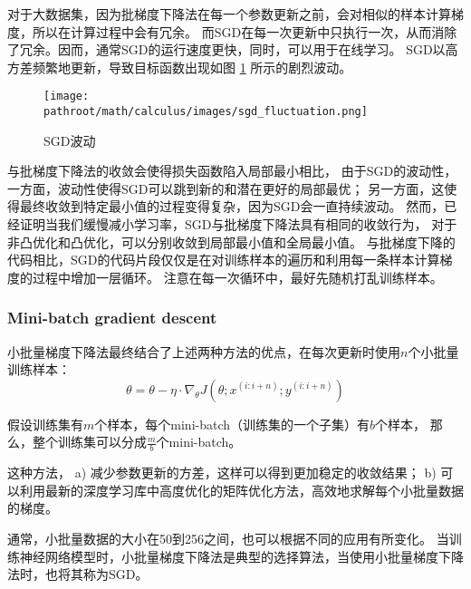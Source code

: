 \documentclass[a4paper,10pt]{ctexbook}
\providecommand{\pathroot}{../..}
\begin{document}
对于大数据集，因为批梯度下降法在每一个参数更新之前，会对相似的样本计算梯度，所以在计算过程中会有冗余。
而SGD在每一次更新中只执行一次，从而消除了冗余。因而，通常SGD的运行速度更快，同时，可以用于在线学习。
SGD以高方差频繁地更新，导致目标函数出现如图 \ref{fig:sgd_fluctuation} 所示的剧烈波动。

\begin{figure}[H]
    \centering
    \texttt{[image: \\pathroot/math/calculus/images/sgd\_fluctuation.png]}
    \caption{SGD波动}
    \label{fig:sgd_fluctuation}
\end{figure}

与批梯度下降法的收敛会使得损失函数陷入局部最小相比，
由于SGD的波动性，一方面，波动性使得SGD可以跳到新的和潜在更好的局部最优；
另一方面，这使得最终收敛到特定最小值的过程变得复杂，因为SGD会一直持续波动。
然而，已经证明当我们缓慢减小学习率，SGD与批梯度下降法具有相同的收敛行为，
对于非凸优化和凸优化，可以分别收敛到局部最小值和全局最小值。
与批梯度下降的代码相比，SGD的代码片段仅仅是在对训练样本的遍历和利用每一条样本计算梯度的过程中增加一层循环。
注意在每一次循环中，最好先随机打乱训练样本。


\subsubsection{Mini-batch gradient descent}
小批量梯度下降法最终结合了上述两种方法的优点，在每次更新时使用$n$个小批量训练样本：
\[
    \theta = \theta - \eta \cdot \nabla_{\theta}{J(\theta;x^{(i:i+n)};y^{(i:i+n)})}
\]

假设训练集有$m$个样本，每个mini-batch（训练集的一个子集）有$b$个样本，
那么，整个训练集可以分成$\frac{m}{b}$个mini-batch。

这种方法，
a) 减少参数更新的方差，这样可以得到更加稳定的收敛结果；
b) 可以利用最新的深度学习库中高度优化的矩阵优化方法，高效地求解每个小批量数据的梯度。

通常，小批量数据的大小在50到256之间，也可以根据不同的应用有所变化。
当训练神经网络模型时，小批量梯度下降法是典型的选择算法，当使用小批量梯度下降法时，也将其称为SGD。
\end{document}

